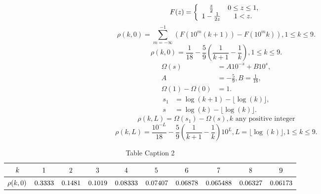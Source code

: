 \documentclass[titlepage,fleqn]{article}%
\begin{document}
\[
F(z)=\left\{
\begin{array}
[c]{cc}%
\frac{z}{2} & 0\leq z\leq1,\\
1-\frac{1}{2z} & 1<z.
\end{array}
\right.
\]%
\[
\rho(k,0)=%
{\displaystyle\sum\limits_{m=-\infty}^{-1}}
\left(  F(10^{m}(k+1))-F(10^{m}k)\right)  ,1\leq k\leq9.
\]%
\begin{equation}
\rho(k,0)=\frac{1}{18}-\frac{5}{9}\left(  \frac{1}{k+1}-\frac{1}{k}\right)
,1\leq k\leq9. \label{Rati01}%
\end{equation}%
\begin{align*}
\Omega(s)  &  =A10^{-s}+B10^{s},\\
A  &  =-\frac{5}{9},B=\frac{1}{18},\\
\Omega(1)-\Omega(0)  &  =1.
\end{align*}%
\begin{align*}
s_{1}  &  =\log(k+1)-\lfloor\log(k)\rfloor,\\
s  &  =\log(k)-\lfloor\log(k)\rfloor.
\end{align*}%
\[
\rho(k,L)=\Omega(s_{1})-\Omega(s),k\text{ \ any positive integer}%
\]%
\begin{equation}
\rho(k,L)=\frac{10^{-L}}{18}-\frac{5}{9}\left(  \frac{1}{k+1}-\frac{1}%
{k}\right)  10^{L},L=\lfloor\log(k)\rfloor,1\leq k\leq9. \label{Ratio2}%
\end{equation}%
\begin{table}[!htbp] \centering
\begin{tabular}
[c]{|c|c|c|c|c|c|c|c|c|c|}\hline\hline
${\small k}$ & ${\small 1}$ & ${\small 2}$ & ${\small 3}$ & ${\small 4}$ &
${\small 5}$ & ${\small 6}$ & ${\small 7}$ & ${\small 8}$ & ${\small 9}%
$\\\hline
${\small \rho(k,0)}$ & ${\small 0.3333}$ & ${\small 0.1481}$ &
${\small 0.1019}$ & ${\small 0.08333}$ & ${\small 0.07407}$ &
${\small 0.06878}$ & ${\small 0.065488}$ & ${\small 0.06327}$ &
${\small 0.06173}$\\\hline\hline
\end{tabular}
\caption{Table Caption 2}\label{TableKey2}%
\end{table}%


\bigskip
\end{document}
